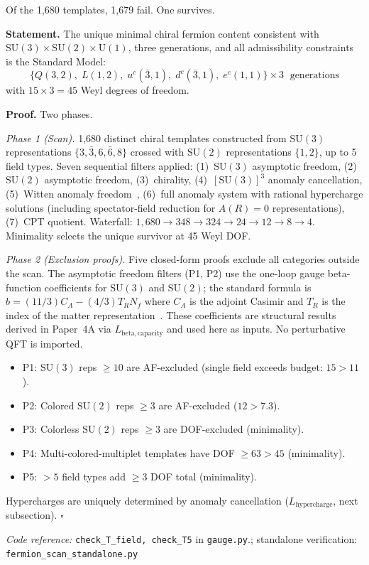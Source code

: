 \documentclass[11pt]{article}
\newenvironment{varlist}{\begin{itemize}[nosep,leftmargin=2em]}{\end{itemize}}
\newcommand{\coderef}[2]{\smallskip\noindent\textit{Code reference:} \texttt{#1} in \texttt{#2}.}
\newcommand{\SU}{\mathrm{SU}}
\newcommand{\U}{\mathrm{U}}
\begin{document}
Of the 1{,}680 templates, 1{,}679 fail.  One survives.

\begin{tcolorbox}[apfbox, title={Theorem $T_{\mathrm{field}}$ (SM Fermion Content)}]
\textbf{Statement.}  The unique minimal chiral fermion content consistent with $\SU(3) \times \SU(2) \times \U(1)$, three generations, and all admissibility constraints is the Standard Model:
\begin{equation}
\{Q(3,2),\; L(1,2),\; u^c(\bar{3},1),\; d^c(\bar{3},1),\; e^c(1,1)\} \times 3 \;\text{ generations}
\label{eq:fermion_content}
\end{equation}
with $15 \times 3 = 45$ Weyl degrees of freedom.

\smallskip\noindent\textbf{Proof.}  Two phases.

\textit{Phase 1 (Scan).}  1{,}680 distinct chiral templates constructed from $\SU(3)$ representations $\{3, \bar{3}, 6, \bar{6}, 8\}$ crossed with $\SU(2)$ representations $\{1, 2\}$, up to 5 field types.  Seven sequential filters applied: (1)~$\SU(3)$ asymptotic freedom, (2)~$\SU(2)$ asymptotic freedom, (3)~chirality, (4)~$[\SU(3)]^3$ anomaly cancellation, (5)~Witten anomaly freedom~\cite{Witten1982}, (6)~full anomaly system with rational hypercharge solutions (including spectator-field reduction for $A(R)=0$ representations), (7)~CPT quotient.  Waterfall: $1{,}680 \to 348 \to 324 \to 24 \to 12 \to 8 \to 4$.  Minimality selects the unique survivor at 45 Weyl DOF.

\textit{Phase 2 (Exclusion proofs).}  Five closed-form proofs exclude all categories outside the scan.  The asymptotic freedom filters (P1, P2) use the one-loop gauge beta-function coefficients for $\SU(3)$ and $\SU(2)$; the standard formula is $b = (11/3)C_A - (4/3)T_R N_f$ where $C_A$ is the adjoint Casimir and $T_R$ is the index of the matter representation~\cite{PeskinSchroeder1995}.  These coefficients are structural results derived in Paper~4A via $L_{\mathrm{beta,capacity}}$ and used here as inputs.  No perturbative QFT is imported.
\begin{varlist}
\item P1: $\SU(3)$ reps $\ge 10$ are AF-excluded (single field exceeds budget: $15 > 11$).
\item P2: Colored $\SU(2)$ reps $\ge 3$ are AF-excluded ($12 > 7.3$).
\item P3: Colorless $\SU(2)$ reps $\ge 3$ are DOF-excluded (minimality).
\item P4: Multi-colored-multiplet templates have DOF $\ge 63 > 45$ (minimality).
\item P5: $> 5$ field types add $\ge 3$ DOF total (minimality).
\end{varlist}

Hypercharges are uniquely determined by anomaly cancellation ($L_{\mathrm{hypercharge}}$, next subsection).  $\square$

\coderef{check\_T\_field, check\_T5}{gauge.py}; standalone verification: \texttt{fermion\_scan\_standalone.py}~\cite{BrookeFermionScan}
\end{tcolorbox}
\end{document}
